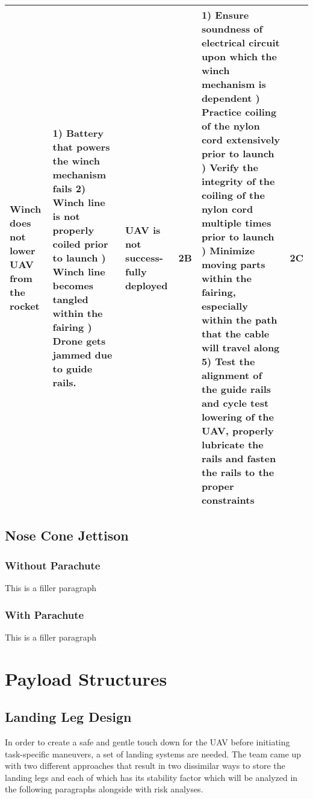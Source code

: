 \begin{table}[H]
{\begin{tabularx}{\linewidth}{XXXlXl}
    Winch does not lower UAV from the rocket & 1) Battery that powers the winch mechanism fails 2) Winch line is not properly coiled prior to launch \newline 3) Winch line becomes tangled within the fairing \newline 4) Drone gets jammed due to guide rails. & UAV is not success-fully deployed & \cellcolor{red!25} 2B & 1) Ensure soundness of electrical circuit upon which the winch mechanism is dependent \newline 2) Practice coiling of the nylon cord extensively prior to launch \newline 3) Verify the integrity of the coiling of the nylon cord multiple times prior to launch \newline 4) Minimize moving parts within the fairing, especially within the path that the cable will travel along 5) Test the alignment of the guide rails and cycle test lowering of the UAV, properly lubricate the rails and fasten the rails to the proper constraints & \cellcolor{orange!25} 2C \\
    \bottomrule
    \end{tabularx}
    }
\end{table}
	

	\subsection{Nose Cone Jettison}
		\subsubsection{Without Parachute}
			This is a filler paragraph
		
		\subsubsection{With Parachute}
			This is a filler paragraph

\section{Payload Structures}\label{PL:Tradeoffs:Structures}
	\subsection{Landing Leg Design}
		In order to create a safe and gentle touch down for the UAV before initiating task-specific maneuvers, a set of landing systems are needed. The team came up with two different approaches that result in two dissimilar ways to store the landing legs and each of which has its stability factor which will be analyzed in the following paragraphs alongside with risk analyses.
